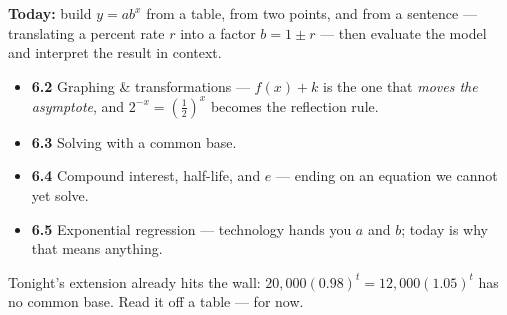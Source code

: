 \documentclass[aspectratio=169, 11pt]{beamer}
\begin{document}
\begin{frame}[t, plain]
  \textbf{Today:} build $y=ab^{x}$ from a table, from two points, and from a sentence --- translating
  a percent rate $r$ into a factor $b=1\pm r$ --- then evaluate the model and interpret the result in
  context.\\[8pt]
  \begin{itemize}\setlength{\itemsep}{3pt}
    \item \textbf{6.2} Graphing \& transformations --- $f(x)+k$ is the one that \emph{moves the asymptote}, and $2^{-x}=\left(\frac12\right)^{x}$ becomes the reflection rule.
    \item \textbf{6.3} Solving with a common base.
    \item \textbf{6.4} Compound interest, half-life, and $e$ --- ending on an equation we cannot yet solve.
    \item \textbf{6.5} Exponential regression --- technology hands you $a$ and $b$; today is why that means anything.
  \end{itemize}
  \vspace{6pt}
  \begin{center}
    {\footnotesize Tonight's extension already hits the wall: $20{,}000(0.98)^{t}=12{,}000(1.05)^{t}$
    has no common base. Read it off a table --- for now.}
  \end{center}
\end{frame}
\end{document}
